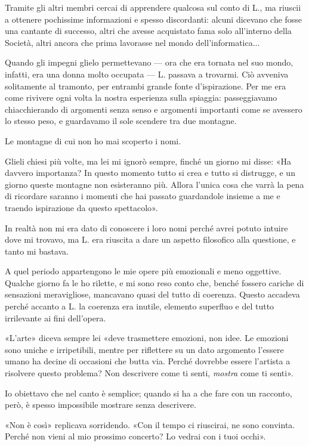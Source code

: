 \documentclass[a4paper,11pt,oneside,openright,final]{memoir}
\begin{document}
Tramite gli altri membri cercai di apprendere qualcosa sul conto di L., ma
riuscii a ottenere pochissime informazioni e spesso discordanti: alcuni dicevano
che fosse una cantante di successo, altri che avesse acquistato fama solo
all'interno della Società, altri ancora che prima lavorasse nel mondo
dell'informatica...

Quando gli impegni glielo permettevano --- ora che era tornata nel suo mondo,
infatti, era una donna molto occupata --- L. passava a trovarmi. Ciò avveniva
solitamente al tramonto, per entrambi grande fonte d'ispirazione. Per me era
come rivivere ogni volta la nostra esperienza sulla spiaggia: passeggiavamo
chiacchierando di argomenti senza senso e argomenti importanti come se avessero
lo stesso peso, e guardavamo il sole scendere tra due montagne.

Le montagne di cui non ho mai scoperto i nomi.

Glieli chiesi più volte, ma lei mi ignorò sempre, finché un giorno mi disse:
«Ha davvero importanza? In questo momento tutto si crea e tutto si distrugge,
e un giorno queste montagne non esisteranno più. Allora l'unica cosa che varrà
la pena di ricordare saranno i momenti che hai passato guardandole insieme a me
e traendo ispirazione da questo spettacolo».

In realtà non mi era dato di conoscere i loro nomi perché avrei potuto intuire
dove mi trovavo, ma L. era riuscita a dare un aspetto filosofico alla questione,
e tanto mi bastava.

A quel periodo appartengono le mie opere più emozionali e meno oggettive.
Qualche giorno fa le ho rilette, e mi sono reso conto che, benché fossero
cariche di sensazioni meravigliose, mancavano quasi del tutto di coerenza.
Questo accadeva perché accanto a L. la coerenza era inutile, elemento superfluo
e del tutto irrilevante ai fini dell'opera.

«L'arte» diceva sempre lei «deve trasmettere emozioni, non idee. Le emozioni
sono uniche e irripetibili, mentre per riflettere su un dato argomento l'essere
umano ha decine di occasioni che butta via. Perché dovrebbe essere l'artista a
risolvere questo problema? Non descrivere come ti senti, \emph{mostra} come ti
senti».

Io obiettavo che nel canto è semplice; quando si ha a che fare con un racconto,
però, è spesso impossibile mostrare senza descrivere.

«Non è così» replicava sorridendo. «Con il tempo ci riuscirai, ne sono convinta.
Perché non vieni al mio prossimo concerto? Lo vedrai con i tuoi occhi».
\end{document}
